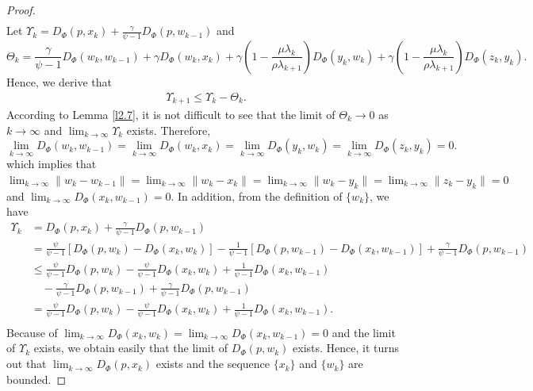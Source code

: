 \documentclass[hidelinks,11 pt]{article}
\numberwithin{equation}{section}
\theoremstyle{definition}  %
\numberwithin{equation}{section}
\numberwithin{theorem}{section}
\begin{document}
\begin{proof}
\begin{align*}
\end{align*}
Let $\Upsilon_{k} = D_{\Phi}(p,x_{k})+\frac{\gamma}{\psi-1}D_{\Phi}(p,w_{k-1})$ and 
\begin{equation*}
   \Theta_{k}=\frac{\gamma}{\psi-1}D_{\Phi}(w_k,w_{k-1})+\gamma D_{\Phi}(w_{k},x_{k})+\gamma\left(1-\frac{\mu\lambda_{k}}{\rho\lambda_{k+1}}\right) D_{\Phi}(y_k, w_k)+\gamma\left(1-\frac{\mu\lambda_{k}}{\rho\lambda_{k+1}}\right) D_{\Phi}(z_k, y_k). 
\end{equation*}
Hence, we derive that 
\begin{align*}
    \Upsilon_{k+1}\leq \Upsilon_{k}-\Theta_{k}. 
\end{align*}
According to Lemma \ref{l2.7}, it is not difficult to see that the limit of $\Theta_{k}\to 0$ as $k\to\infty$ and $\lim_{k\to\infty}\Upsilon_{k}$ exists. Therefore, 
\begin{equation*}
    \lim_{k\to\infty}D_{\Phi}(w_k,w_{k-1}) =  \lim_{k\to\infty}D_{\Phi}(w_{k},x_{k}) =   \lim_{k\to\infty}D_{\Phi}(y_k, w_k) =  \lim_{k\to\infty}D_{\Phi}(z_k, y_k) =0.   
\end{equation*}
which implies that $
\lim_{k \to \infty} \|w_k - w_{k-1}\| = 
\lim_{k \to \infty} \|w_k - x_k\| = 
\lim_{k \to \infty} \|w_k - y_k\| = 
\lim_{k \to \infty} \|z_k - y_k\| = 0$ 
and $\lim_{k\to\infty}D_{\Phi}(x_{k},w_{k-1})=0$. 
\vskip 2mm 
In addition, from the definition of $\{w_{k}\}$, we have 
\begin{align*}
    \Upsilon_k &= D_{\Phi}(p,x_{k})+\frac{\gamma}{\psi-1}D_{\Phi}(p,w_{k-1})\\
    & =\frac{\psi}{\psi-1}\left[D_{\Phi}(p,w_{k})-D_{\Phi}(x_{k},w_{k})\right]-\frac{1}{\psi-1}\left[D_{\Phi}(p,w_{k-1})-D_{\Phi}(x_{k},w_{k-1})\right]+\frac{\gamma}{\psi-1}D_{\Phi}(p,w_{k-1})\\
    &\leq \frac{\psi}{\psi-1}D_{\Phi}(p,w_{k})-\frac{\psi}{\psi-1}D_{\Phi}(x_{k},w_{k})+\frac{1}{\psi-1}D_{\Phi}(x_{k},w_{k-1})\\
    &\quad-\frac{\gamma}{\psi-1}D_{\Phi}(p,w_{k-1})+\frac{\gamma}{\psi-1}D_{\Phi}(p,w_{k-1})\\
    & = \frac{\psi}{\psi-1}D_{\Phi}(p,w_{k})-\frac{\psi}{\psi-1}D_{\Phi}(x_{k},w_{k})+\frac{1}{\psi-1}D_{\Phi}(x_{k},w_{k-1}).\\
\end{align*}
Because of $\lim_{k\to\infty}D_{\Phi}(x_{k},w_{k})=\lim_{k\to\infty}D_{\Phi}(x_{k},w_{k-1})=0$ and the limit of $\Upsilon_{k}$ exists, we obtain easily that the limit of $D_{\Phi}(p,w_{k})$ exists. Hence, it turns out that $\lim_{k \to \infty} D_\Phi(p, x_{k})$  exists and the sequence $\{x_{k}\}$ and $\{w_{k}\}$ are bounded. 

\end{proof}
\end{document}
